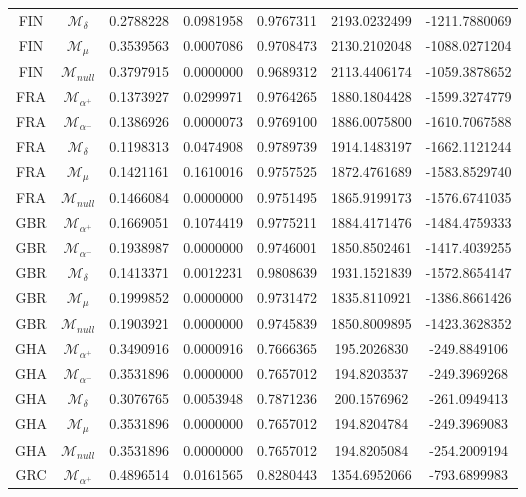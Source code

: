 \begin{tabular}{ccccccc}
FIN & $\mathcal{M}_{\delta}$ & 0.2788228 & 0.0981958 & 0.9767311 & 2193.0232499 & -1211.7880069\\
FIN & $\mathcal{M}_{\mu}$ & 0.3539563 & 0.0007086 & 0.9708473 & 2130.2102048 & -1088.0271204\\
FIN & $\mathcal{M}_{null}$ & 0.3797915 & 0.0000000 & 0.9689312 & 2113.4406174 & -1059.3878652\\
FRA & $\mathcal{M}_{\alpha^+}$ & 0.1373927 & 0.0299971 & 0.9764265 & 1880.1804428 & -1599.3274779\\
FRA & $\mathcal{M}_{\alpha^-}$ & 0.1386926 & 0.0000073 & 0.9769100 & 1886.0075800 & -1610.7067588\\
FRA & $\mathcal{M}_{\delta}$ & 0.1198313 & 0.0474908 & 0.9789739 & 1914.1483197 & -1662.1121244\\
FRA & $\mathcal{M}_{\mu}$ & 0.1421161 & 0.1610016 & 0.9757525 & 1872.4761689 & -1583.8529740\\
FRA & $\mathcal{M}_{null}$ & 0.1466084 & 0.0000000 & 0.9751495 & 1865.9199173 & -1576.6741035\\
GBR & $\mathcal{M}_{\alpha^+}$ & 0.1669051 & 0.1074419 & 0.9775211 & 1884.4171476 & -1484.4759333\\
GBR & $\mathcal{M}_{\alpha^-}$ & 0.1938987 & 0.0000000 & 0.9746001 & 1850.8502461 & -1417.4039255\\
GBR & $\mathcal{M}_{\delta}$ & 0.1413371 & 0.0012231 & 0.9808639 & 1931.1521839 & -1572.8654147\\
GBR & $\mathcal{M}_{\mu}$ & 0.1999852 & 0.0000000 & 0.9731472 & 1835.8110921 & -1386.8661426\\
GBR & $\mathcal{M}_{null}$ & 0.1903921 & 0.0000000 & 0.9745839 & 1850.8009895 & -1423.3628352\\
GHA & $\mathcal{M}_{\alpha^+}$ & 0.3490916 & 0.0000916 & 0.7666365 & 195.2026830 & -249.8849106\\
GHA & $\mathcal{M}_{\alpha^-}$ & 0.3531896 & 0.0000000 & 0.7657012 & 194.8203537 & -249.3969268\\
GHA & $\mathcal{M}_{\delta}$ & 0.3076765 & 0.0053948 & 0.7871236 & 200.1576962 & -261.0949413\\
GHA & $\mathcal{M}_{\mu}$ & 0.3531896 & 0.0000000 & 0.7657012 & 194.8204784 & -249.3969083\\
GHA & $\mathcal{M}_{null}$ & 0.3531896 & 0.0000000 & 0.7657012 & 194.8205084 & -254.2009194\\
GRC & $\mathcal{M}_{\alpha^+}$ & 0.4896514 & 0.0161565 & 0.8280443 & 1354.6952066 & -793.6899983\\

\end{tabular}
